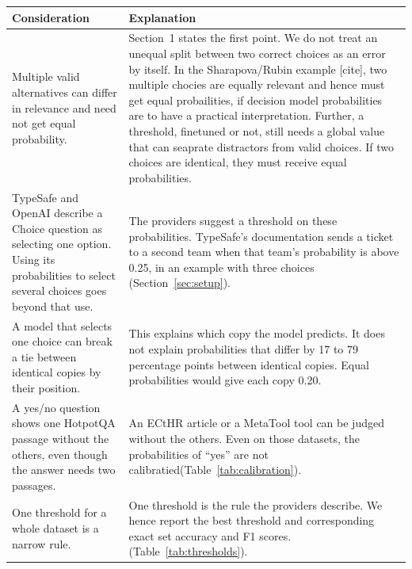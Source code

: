 \begin{tabular}{p{}p{}}
\toprule
Consideration & Explanation
\\

\midrule
Multiple valid alternatives can differ in relevance and need not get equal probability.
& Section~1 states the first point. We do not treat an unequal split between two correct choices as an error by itself. In the Sharapova/Rubin example [cite], two multiple chocies are equally relevant and hence must get equal probailities, if decision model probabilities are to have a practical interpretation. Further, a threshold, finetuned or not, still needs a global value that can seaprate distractors from valid choices. If two choices are identical, they must receive equal probabilities.
\\

\addlinespace
TypeSafe and OpenAI describe a Choice question as selecting one option. Using its probabilities to select several choices goes beyond that use.
& The providers suggest a threshold on these probabilities. TypeSafe's documentation sends a ticket to a second team when that team's probability is above 0.25, in an example with three choices (Section~\ref{sec:setup}).
\\

\addlinespace
A model that selects one choice can break a tie between identical copies by their position.
& This explains which copy the model predicts. It does not explain probabilities that differ by 17 to 79 percentage points between identical copies. Equal probabilities would give each copy 0.20.
\\

\addlinespace
A yes/no question shows one HotpotQA passage without the others, even though the answer needs two passages.
& An ECtHR article or a MetaTool tool can be judged without the others. Even on those datasets, the probabilities of ``yes'' are not calibratied(Table~\ref{tab:calibration}).
\\

\addlinespace
One threshold for a whole dataset is a narrow rule.
& One threshold is the rule the providers describe. We hence report the best threshold and corresponding exact set accuracy and F1 scores. (Table~\ref{tab:thresholds}).
\\


\end{tabular}
